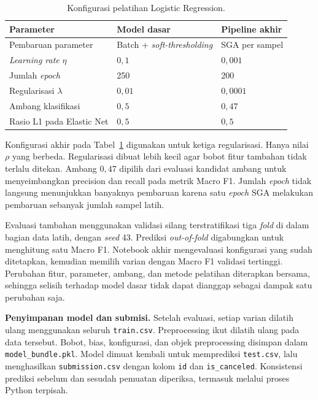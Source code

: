 \begin{table}[htbp]
    \centering
    \caption{Konfigurasi pelatihan Logistic Regression.}
    \label{tab:lr-config}
    \begin{tabular}{lll}
        \toprule
        Parameter                     & Model dasar                        & Pipeline akhir \\
        \midrule
        Pembaruan parameter           & Batch + \textit{soft-thresholding} & SGA per sampel \\
        \textit{Learning rate} $\eta$ & $0{,}1$                            & $0{,}001$      \\
        Jumlah \textit{epoch}         & 250                                & 200            \\
        Regularisasi $\lambda$        & $0{,}01$                           & $0{,}0001$     \\
        Ambang klasifikasi            & $0{,}5$                            & $0{,}47$       \\
        Rasio L1 pada Elastic Net     & $0{,}5$                            & $0{,}5$        \\
        \bottomrule
    \end{tabular}
\end{table}

Konfigurasi akhir pada Tabel~\ref{tab:lr-config} digunakan untuk ketiga regularisasi. Hanya nilai $\rho$ yang berbeda. Regularisasi dibuat lebih kecil agar bobot fitur tambahan tidak terlalu ditekan. Ambang $0{,}47$ dipilih dari evaluasi kandidat ambang untuk menyeimbangkan precision dan recall pada metrik Macro F1. Jumlah \textit{epoch} tidak langsung menunjukkan banyaknya pembaruan karena satu \textit{epoch} SGA melakukan pembaruan sebanyak jumlah sampel latih.

Evaluasi tambahan menggunakan validasi silang terstratifikasi tiga \textit{fold} di dalam bagian data latih, dengan \textit{seed} 43. Prediksi \textit{out-of-fold} digabungkan untuk menghitung satu Macro F1. Notebook akhir mengevaluasi konfigurasi yang sudah ditetapkan, kemudian memilih varian dengan Macro F1 validasi tertinggi. Perubahan fitur, parameter, ambang, dan metode pelatihan diterapkan bersama, sehingga selisih terhadap model dasar tidak dapat dianggap sebagai dampak satu perubahan saja.

\textbf{Penyimpanan model dan submisi.}
Setelah evaluasi, setiap varian dilatih ulang menggunakan seluruh \texttt{train.csv}. Preprocessing ikut dilatih ulang pada data tersebut. Bobot, bias, konfigurasi, dan objek preprocessing disimpan dalam \texttt{model\_bundle.pkl}. Model dimuat kembali untuk memprediksi \texttt{test.csv}, lalu menghasilkan \texttt{submission.csv} dengan kolom \texttt{id} dan \texttt{is\_canceled}. Konsistensi prediksi sebelum dan sesudah pemuatan diperiksa, termasuk melalui proses Python terpisah.

